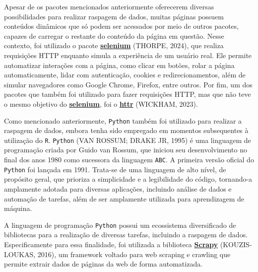 \documentclass[
  12pt,
  a4paper,
]{scrreprt}
\begin{document}
\vspace{12pt}

Apesar de os pacotes mencionados anteriormente oferecerem diversas
possibilidades para realizar raspagem de dados, muitas páginas possuem
conteúdos dinâmicos que só podem ser acessados por meio de outros
pacotes, capazes de carregar o restante do conteúdo da página em
questão. Nesse contexto, foi utilizado o pacote
\href{https://cran.r-project.org/web/packages/selenium/index.html}{\textbf{selenium}}
(THORPE, 2024), que realiza requisições HTTP enquanto simula a
experiência de um usuário real. Ele permite automatizar interações com a
página, como clicar em botões, rolar a página automaticamente, lidar com
autenticação, cookies e redirecionamentos, além de simular navegadores
como Google Chrome, Firefox, entre outros. Por fim, um dos pacotes que
também foi utilizado para fazer requisições HTTP, mas que não teve o
mesmo objetivo do
\href{https://cran.r-project.org/web/packages/selenium/index.html}{\textbf{selenium}},
foi o \href{https://httr.r-lib.org/}{\textbf{httr}} (WICKHAM, 2023).

\vspace{12pt}

Como mencionado anteriormente, \texttt{Python} também foi utilizado para
realizar a raspagem de dados, embora tenha sido empregado em momentos
subsequentes à utilização do \texttt{R}. \texttt{Python} (VAN ROSSUM;
DRAKE JR, 1995) é uma linguagem de programação criada por Guido van
Rossum, que iniciou seu desenvolvimento no final dos anos 1980 como
sucessora da linguagem \texttt{ABC}. A primeira versão oficial do
\texttt{Python} foi lançada em 1991. Trata-se de uma linguagem de alto
nível, de propósito geral, que prioriza a simplicidade e a legibilidade
do código, tornando-a amplamente adotada para diversas aplicações,
incluindo análise de dados e automação de tarefas, além de ser
amplamente utilizada para aprendizagem de máquina.

\vspace{12pt}

A linguagem de programação \texttt{Python} possui um ecossistema
diversificado de bibliotecas para a realização de diversas tarefas,
incluindo a raspagem de dados. Especificamente para essa finalidade, foi
utilizada a biblioteca
\href{https://docs.scrapy.org/en/latest}{\textbf{Scrapy}}
(KOUZIS-LOUKAS, 2016), um framework voltado para web scraping e crawling
que permite extrair dados de páginas da web de forma automatizada.

\vspace{12pt}
\end{document}
